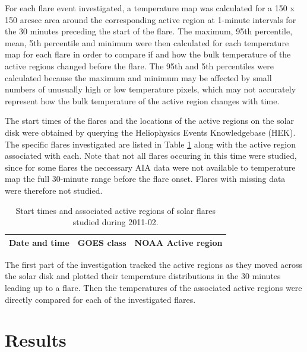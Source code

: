 \documentclass[referee,a4paper,12pt,traditabstract]{swsc}
\begin{document}
\begin{linenumbers}
For each flare event investigated, a temperature map was calculated for a 150 x 150 arcsec area around the corresponding active region at 1-minute intervals for the 30 minutes preceding the start of the flare.
The maximum, 95th percentile, mean, 5th percentile and minimum were then calculated for each temperature map for each flare in order to compare if and how the bulk temperature of the active regions changed before the flare.
The 95th and 5th percentiles were calculated because the maximum and minimum may be affected by small numbers of unusually high or low temperature pixels, which may not accurately represent how the bulk temperature of the active region changes with time.

The start times of the flares and the locations of the active regions on the solar disk were obtained by querying the Heliophysics Events Knowledgebase (HEK).
The specific flares investigated are listed in Table \ref{tab:flares} along with the active region associated with each.
Note that not all flares occuring in this time were studied, since for some flares the neccessary AIA data were not available to temperature map the full 30-minute range before the flare onset.
Flares with missing data were therefore not studied.

\begin{table}
	\centering
		\begin{tabular}{c|c|c}
			Date and time & GOES class & NOAA Active region \\
			\hline
		\end{tabular}
	\caption{Start times and associated active regions of solar flares studied during 2011-02.}
	\label{tab:flares}
\end{table}

The first part of the investigation tracked the active regions as they moved across the solar disk and plotted their temperature distributions in the 30 minutes leading up to a flare.
Then the temperatures of the associated active regions were directly compared for each of the investigated flares.

\section{Results}

\end{linenumbers}
\end{document}
